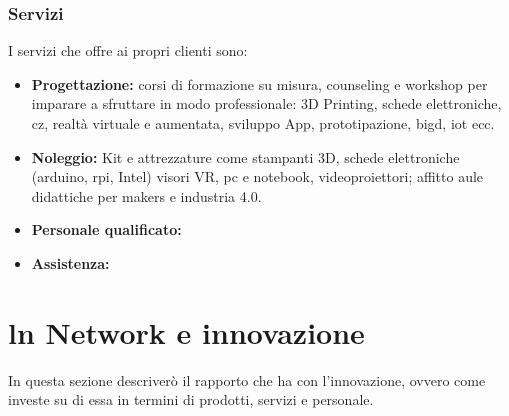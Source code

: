 \subsubsection{Servizi}
I servizi che \lab{} offre ai propri clienti sono:
\begin{itemize}
\item \textbf{Progettazione:} corsi di formazione su misura, \gls{counseling} e \gls{workshop} per imparare a sfruttare in modo professionale: 3D Printing, schede elettroniche, \gls{cz}, realtà virtuale e aumentata, sviluppo App, prototipazione, \gls{bigd}, \gls{iot} ecc.
\item \textbf{Noleggio:} Kit e attrezzature come stampanti 3D, schede elettroniche (\gls{arduino}, \gls{rpi}, Intel) visori VR, pc e notebook, videoproiettori; affitto aule didattiche per \gls{makers} e industria 4.0.
\item \textbf{Personale qualificato:}
\item \textbf{Assistenza:}
\end{itemize}

\section{ln Network e innovazione}
In questa sezione descriverò il rapporto che \lab{} ha con l'innovazione, ovvero come investe su di essa in termini di prodotti, servizi e personale.